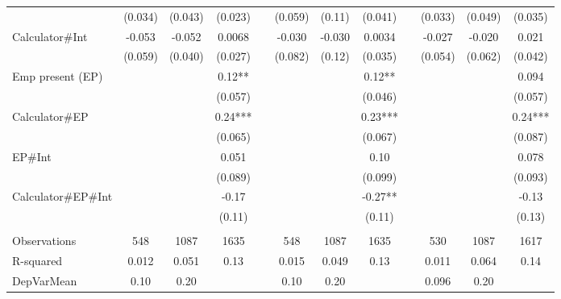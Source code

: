 \begin{tabular}{lccccccccccc}
      & (0.034) & (0.043) & (0.023) &       & (0.059) & (0.11) & (0.041) &       & (0.033) & (0.049) & (0.035) \\
Calculator\#Int & -0.053 & -0.052 & 0.0068 &       & -0.030 & -0.030 & 0.0034 &       & -0.027 & -0.020 & 0.021 \\
      & (0.059) & (0.040) & (0.027) &       & (0.082) & (0.12) & (0.035) &       & (0.054) & (0.062) & (0.042) \\
Emp present (EP) &       &       & 0.12** &       &       &       & 0.12** &       &       &       & 0.094 \\
      &       &       & (0.057) &       &       &       & (0.046) &       &       &       & (0.057) \\
Calculator\#EP   &       &       & 0.24*** &       &       &       & 0.23*** &       &       &       & 0.24*** \\
      &       &       & (0.065) &       &       &       & (0.067) &       &       &       & (0.087) \\
EP\#Int &       &       & 0.051 &       &       &       & 0.10  &       &       &       & 0.078 \\
      &       &       & (0.089) &       &       &       & (0.099) &       &       &       & (0.093) \\
Calculator\#EP\#Int &       &       & -0.17 &       &       &       & -0.27** &       &       &       & -0.13 \\
      &       &       & (0.11) &       &       &       & (0.11) &       &       &       & (0.13) \\
      &       &       &       &       &       &       &       &       &       &       &  \\
\midrule
Observations & 548   & 1087  & 1635  &       & 548   & 1087  & 1635  &       & 530   & 1087  & 1617 \\
R-squared & 0.012 & 0.051 & 0.13  &       & 0.015 & 0.049 & 0.13  &       & 0.011 & 0.064 & 0.14 \\
DepVarMean & 0.10  & 0.20  &       &       & 0.10  & 0.20  &       &       & 0.096 & 0.20  &  \\
\bottomrule
\bottomrule
\end{tabular}%
